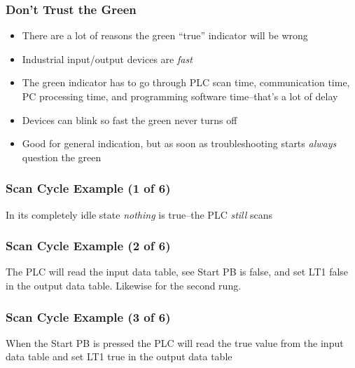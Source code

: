 \begin{frame}
    \frametitle{Don't Trust the Green}

    \begin{itemize}
        \item There are a lot of reasons the green ``true'' indicator will be wrong
        \item Industrial input/output devices are \emph{fast}
        \item The green indicator has to go through PLC scan time, communication time, PC processing time, and programming software time--that's a lot of delay
        \item Devices can blink so fast the green never turns off
        \item Good for general indication, but as soon as troubleshooting starts \emph{always} question the green
    \end{itemize}
\end{frame}

\begin{frame}
    \frametitle{Scan Cycle Example (1 of 6)}

    \begin{figure}
        \centering
        \resizebox{0.75\linewidth}{!}{
            
        }
    \end{figure}

    \vspace{0.5em}
    \centering
    {\footnotesize In its completely idle state \emph{nothing} is true--the PLC \emph{still} scans\par}
\end{frame}

\begin{frame}
    \frametitle{Scan Cycle Example (2 of 6)}

    \begin{figure}
        \centering
        \resizebox{0.75\linewidth}{!}{
            
        }
    \end{figure}

    \vspace{0.5em}
    \centering
    {\footnotesize The PLC will read the input data table, see Start PB is false, and set LT1 false in the output data table. Likewise for the second rung.\par}
\end{frame}

\begin{frame}
    \frametitle{Scan Cycle Example (3 of 6)}

    \begin{figure}
        \centering
        \resizebox{0.75\linewidth}{!}{
            
        }
    \end{figure}

    \vspace{0.5em}
    \centering
    {\footnotesize When the Start PB is pressed the PLC will read the true value from the input data table and set LT1 true in the output data table\par}
\end{frame}

